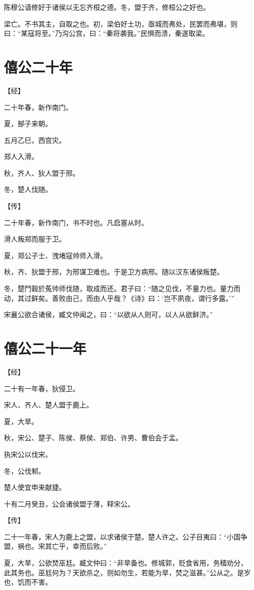 \documentclass[a4paper,12pt,UTF8,twoside]{ctexbook}
\begin{document}
陈穆公请修好于诸侯以无忘齐桓之德。冬，盟于齐，修桓公之好也。

梁亡。不书其主，自取之也。初，梁伯好土功，亟城而弗处，民罢而弗堪，则曰：“某寇将至。”乃沟公宫，曰：“秦将袭我。”民惧而溃，秦遂取梁。


\chapter{僖公二十年}


【经】

二十年春，新作南门。

夏，郜子来朝。

五月乙巳，西宫灾。

郑人入滑。

秋，齐人、狄人盟于邢。

冬，楚人伐随。

【传】

二十年春，新作南门，书不时也。凡启塞从时。

滑人叛郑而服于卫。

夏，郑公子士、洩堵寇帅师入滑。

秋，齐、狄盟于邢，为邢谋卫难也。于是卫方病邢。随以汉东诸侯叛楚。

冬，楚鬥穀於菟帅师伐随，取成而还。君子曰：“随之见伐，不量力也。量力而动，其过鲜矣。善败由己，而由人乎哉？《诗》曰：‘岂不夙夜，谓行多露。’”

宋襄公欲合诸侯，臧文仲闻之，曰：“以欲从人则可，以人从欲鲜济。”


\chapter{僖公二十一年}



【经】

二十有一年春，狄侵卫。

宋人、齐人、楚人盟于鹿上。

夏，大旱。

秋，宋公、楚子、陈侯、蔡侯、郑伯、许男、曹伯会于盂。

执宋公以伐宋。

冬，公伐邾。

楚人使宜申来献捷。

十有二月癸丑，公会诸侯盟于薄，释宋公。

【传】

二十一年春，宋人为鹿上之盟，以求诸侯于楚。楚人许之。公子目夷曰：“小国争盟，祸也。宋其亡乎，幸而后败。”

夏，大旱，公欲焚巫尪。臧文仲曰：“非旱备也。修城郭，贬食省用，务穑劝分，此其务也。巫尪何为？天欲杀之，则如勿生，若能为旱，焚之滋甚。”公从之。是岁也，饥而不害。
\end{document}

